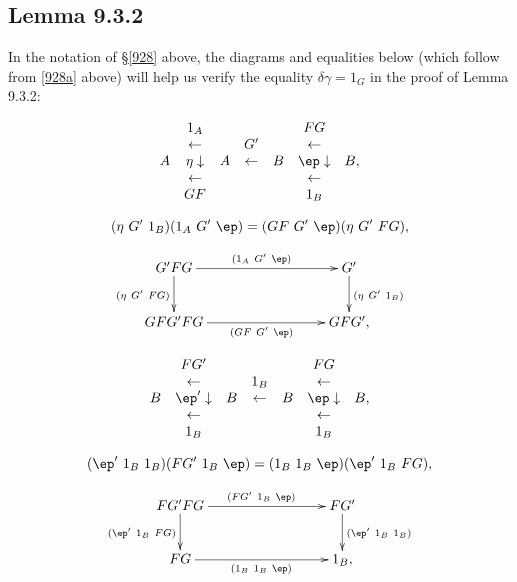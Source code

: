 \documentclass[12pt]{article}
\begin{document}

\newpage

\subsection{Lemma 9.3.2}\label{932}

In the notation of \S\ref{928} above, the diagrams and equalities below (which follow from \eqref{928a} above) will help us verify the equality $\delta\gamma=1_G$ in the proof of Lemma 9.3.2:


$$
\begin{array}{ccccccc}
&1_A&&&&FG\\
&\leftarrow&&G'&&\leftarrow\\
A&\eta\downarrow&A&\leftarrow&B&\ep\downarrow&B,\\
&\leftarrow&&&&\leftarrow\\
&GF&&&&1_B
\end{array}
$$ 

\begin{equation}\label{928c}
(\eta\ G'\ 1_B)(1_A\ G'\ \ep)=(GF\ G'\ \ep)(\eta\ G'\ FG),
\end{equation}

$$
\xymatrix{
G'FG\ar[rrr]^{(1_A\ G'\ \ep)}\ar[d]_{(\eta\ G'\ FG)}&&&G'\ar[d]^{(\eta\ G'\ 1_B)}\\ 
GFG'FG\ar[rrr]_{(GF\ G'\ \ep)}&&&GFG',}
$$


$$
\begin{array}{ccccccc}
&FG'&&&&FG\\
&\leftarrow&&1_B&&\leftarrow\\
B&\ep'\downarrow&B&\leftarrow&B&\ep\downarrow&B,\\
&\leftarrow&&&&\leftarrow\\
&1_B&&&&1_B
\end{array}
$$

\begin{equation}\label{928d}
(\ep'\ 1_B\ 1_B)(FG'\ 1_B\ \ep)=(1_B\ 1_B\ \ep)(\ep'\ 1_B\ FG),
\end{equation}

$$
\xymatrix{
FG'FG\ar[rrr]^{(FG'\ 1_B\ \ep)}\ar[d]_{(\ep'\ 1_B\ FG)}&&&FG'\ar[d]^{(\ep'\ 1_B\ 1_B)}\\ 
FG\ar[rrr]_{(1_B\ 1_B\ \ep)}&&&1_B,}
$$ 
\end{document}
